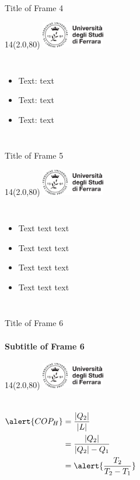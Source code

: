 \documentclass[11pt,xcolor={dvipsnames},default]{beamer} %
\DeclarePairedDelimiter{\abs}{\lvert}{\rvert}
\newcommand{\MyLogo}{%
\begin{textblock}{14}(2.0,80)
 \includegraphics[height=1.15cm, angle=0]{logo}
\end{textblock}
}
\begin{document}
\begin{frame}{Title of Frame 4}
\MyLogo
\begin{columns}
	\begin{itemize}
  		\item<1-> Text: \alert{text}
  		\item<2-> Text: \alert{text}
		\item<3-> Text: \alert{text}
  	\end{itemize}
\end{columns}
\end{frame}

\begin{frame}{Title of Frame 5}
\MyLogo
\begin{columns}
	\begin{itemize}
  		\item Text text text
  		\item Text text text
		\item Text text text
		\item Text text text
  	\end{itemize}
\end{columns}
\end{frame}

\begin{frame}{Title of Frame 6}
\framesubtitle{Subtitle of Frame 6}
\MyLogo
\begin{columns}
\begin{align*}
 \alert{COP_H} &= \dfrac{\abs{Q_2}}{\abs{L}} \\
 	   &= \dfrac{\abs{Q_2}}{\abs{Q_2}-Q_1} \\
 	   &= \alert{\dfrac{T_2}{T_2-T_1}} \\
\end{align*}
\end{columns}
\end{frame}

\end{document}

